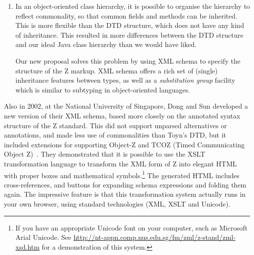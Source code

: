\documentclass{llncs}  %
\newcommand{\Zeta}{Zeta}
\begin{document}
\begin{enumerate}
  To solve this problem, and make it easier to add new kinds of
  annotations, we have changed to a more loosely-typed view of annotations
  that is similar to the annotations in \Zeta.  Each Z construct can contain
  a list of arbitrary annotations.  This
  means that a tool could attach an annotation to an inappropriate
  construct (such as putting a type annotation on a predicate), but such
  annotations do no harm and can simply be ignored.  On the other hand,
  there are many kinds of annotations (such as hyperlinks, source-code
  positions and comments), that we want to be able to attach to arbitrary
  constructs, and this is easier with these loosely-typed annotations.
  
\item In an object-oriented class hierarchy, it is possible to organise
  the hierarchy to reflect commonality, so that common fields and methods
  can be inherited.  This is more flexible than the DTD structure, which
  does not have any kind of inheritance.  This resulted in more differences
  between the DTD structure and our ideal Java class hierarchy than we
  would have liked. 

  Our new proposal solves this problem by using XML schema to specify the
  structure of the Z markup.  XML schema offers a rich set of (single)
  inheritance features between types, as well as a \emph{substitution
  group} facility which is similar to subtyping in object-oriented
  languages.  
\end{enumerate}


Also in 2002, at the National University of Singapore, Dong and Sun
developed a new version of their XML schema, based more closely on
the annotated syntax structure of the Z standard.  This did not
support unparsed alternatives or annotations, and made less use of
commonalities than Toyn's DTD, but it included extensions 
for supporting Object-Z and TCOZ (Timed Communicating Object Z)~\cite{md99a}.
They demonstrated that it is possible to use the XSLT transformation
language to transform the XML form of Z into elegant HTML with proper boxes
and mathematical symbols.\footnote{If you have an appropriate Unicode
  font on your computer, such as Microsoft Arial Unicode.  See
  \url{http://nt-appn.comp.nus.edu.sg/fm/zml/z-stand/zml-xsd.htm} for 
  a demonstration of this system.} 
The generated HTML includes cross-references, and buttons for
expanding schema expressions and folding them again.  The impressive
feature is that this transformation system actually runs in your own
browser, using standard technologies (XML, XSLT and Unicode).
\end{document}
